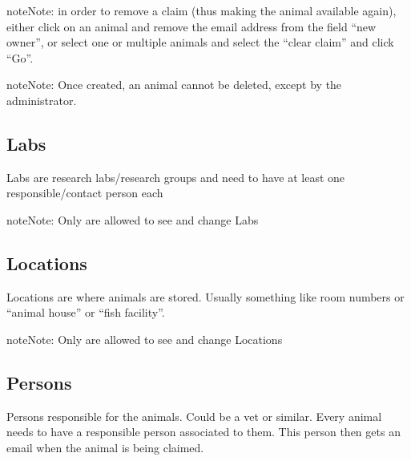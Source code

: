 \documentclass[letterpaper,10pt,openany,oneside,english]{sphinxmanual}
\begin{document}
\noindent{}

\begin{sphinxadmonition}{note}{Note:}
in order to remove a claim (thus making the animal available again), either click on an animal
and remove the email address from the field “new owner”, or select one or multiple animals and
select the “clear claim”  and click “Go”.
\end{sphinxadmonition}

\begin{sphinxadmonition}{note}{Note:}
Once created, an animal cannot be deleted, except by the administrator.
\end{sphinxadmonition}


\subsection{Labs}
\label{\detokenize{index:labs}}
Labs are research labs/research groups and need to have at least one responsible/contact person each

\noindent{}

\begin{sphinxadmonition}{note}{Note:}
Only  are allowed to see and change Labs
\end{sphinxadmonition}


\subsection{Locations}
\label{\detokenize{index:locations}}
Locations are where animals are stored. Usually something like room numbers or “animal house” or “fish facility”.

\noindent{}

\begin{sphinxadmonition}{note}{Note:}
Only  are allowed to see and change Locations
\end{sphinxadmonition}


\subsection{Persons}
\label{\detokenize{index:persons}}
Persons responsible for the animals. Could be a vet or similar.
Every animal needs to have a responsible person associated to them. This person then gets
an email when the animal is being claimed.
\end{document}
